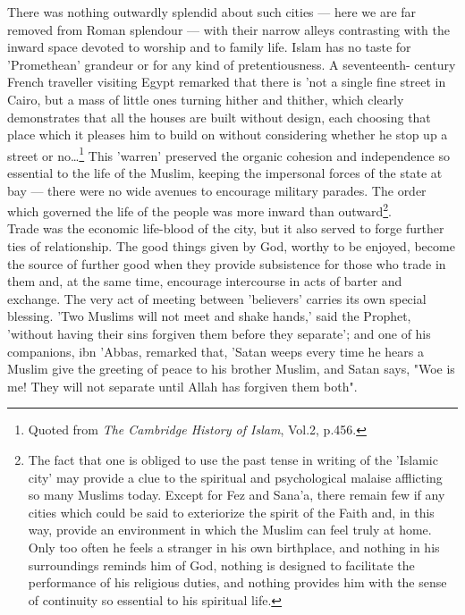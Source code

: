 \documentclass[11pt, b5paper, twoside]{book}
\begin{document}
There was nothing outwardly splendid about such cities --- here we are far removed from Roman splendour --- with their narrow alleys contrasting with the inward space devoted to worship and to family life. 
Islam has no taste for 'Promethean' grandeur or for any kind of pretentiousness. A seventeenth-
century French traveller visiting Egypt remarked that there is 'not a single fine street in Cairo, 
but a mass of little ones turning hither and thither, which clearly demonstrates that all the houses 
are built without design, each choosing that place which it pleases him to build on without 
considering whether he stop up a street or no\ldots{}\footnote{Quoted from \emph{The Cambridge History of Islam}, Vol.2, p.456.} This 'warren' preserved the organic cohesion 
and independence so essential to the life of the Muslim, keeping the impersonal forces of the state 
at bay --- there were no wide avenues to encourage military parades. The order which governed the life 
of the people was more inward than outward\footnote{The fact that one is obliged to use the past tense in writing of the 'Islamic city' may provide a clue to the spiritual and psychological malaise afflicting so many Muslims today. Except for Fez and Sana'a, there remain few if any cities which could be said to exteriorize the spirit of the Faith and, in this way, provide an environment in which the Muslim can feel truly at home. Only too often he feels a stranger in his own birthplace, and nothing in his surroundings reminds him of God, nothing is designed to facilitate the performance of his religious duties, and nothing provides him with the sense of continuity so essential to his spiritual life.}.\\

Trade was the economic life-blood of the city, but it also served to forge further ties of 
relationship. The good things given by God, worthy to be enjoyed, become the source of further good 
when they provide subsistence for those who trade in them and, at the same time, encourage 
intercourse in acts of barter and exchange. The very act of meeting between 'believers' carries its 
own special blessing. 'Two Muslims will not meet and shake hands,' said the Prophet, 'without having 
their sins forgiven them before they separate'; and one of his companions, ibn 'Abbas, remarked that, 
'Satan weeps every time he hears a Muslim give the greeting of peace to his brother Muslim, and Satan 
says, "Woe is me! They will not separate until Allah has forgiven them both". \\
\end{document}
